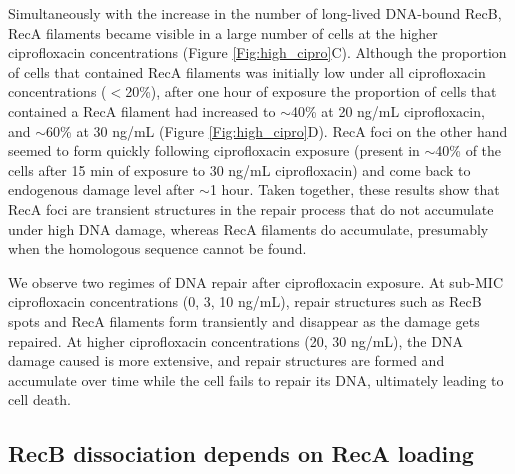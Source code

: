 Simultaneously with the increase in the number of long-lived DNA-bound RecB, RecA filaments became visible in a large number of cells at the higher ciprofloxacin concentrations (Figure \ref{Fig:high_cipro}C). Although the proportion of cells that contained RecA filaments was initially low under all ciprofloxacin concentrations ($<$20\%), after one hour of exposure the proportion of cells that contained a RecA filament had increased to $\sim$40\% at 20 ng/mL ciprofloxacin, and $\sim$60\% at 30 ng/mL (Figure \ref{Fig:high_cipro}D). RecA foci on the other hand seemed to form quickly following ciprofloxacin exposure (present in $\sim$40\% of the cells after 15 min of exposure to 30 ng/mL ciprofloxacin) and come back to endogenous damage level after $\sim$1 hour. Taken together, these results show that RecA foci are transient structures in the repair process that do not accumulate under high DNA damage, whereas RecA filaments do accumulate, presumably when the homologous sequence cannot be found.

We observe two regimes of DNA repair after ciprofloxacin exposure. At sub-MIC ciprofloxacin concentrations (0, 3, 10 ng/mL), repair structures such as RecB spots and RecA filaments form transiently and disappear as the damage gets repaired. At higher ciprofloxacin concentrations (20, 30 ng/mL), the DNA damage caused is more extensive, and repair structures are formed and accumulate over time while the cell fails to repair its DNA, ultimately leading to cell death.


\subsection*{RecB dissociation depends on RecA loading}

